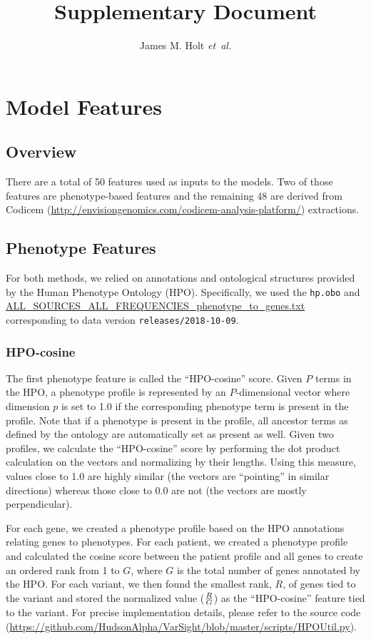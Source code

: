 \documentclass{article}
\begin{document}
\title{Supplementary Document}
\author{James M. Holt {\it et~al.}}

\maketitle

\tableofcontents

\section{Model Features}
\subsection{Overview}
There are a total of 50 features used as inputs to the models.  Two of those features are phenotype-based features and the remaining 48 are derived from Codicem (\url{http://envisiongenomics.com/codicem-analysis-platform/}) extractions.

\subsection{Phenotype Features}
For both methods, we relied on annotations and ontological structures provided by the Human Phenotype Ontology (HPO).  Specifically, we used the \texttt{hp.obo} and \url{ALL_SOURCES_ALL_FREQUENCIES_phenotype_to_genes.txt} corresponding to data version \texttt{releases/2018-10-09}.

\subsubsection{HPO-cosine}
The first phenotype feature is called the ``HPO-cosine'' score.  Given $P$ terms in the HPO, a phenotype profile is represented by an $P$-dimensional vector where dimension $p$ is set to 1.0 if the corresponding phenotype term is present in the profile.  Note that if a phenotype is present in the profile, all ancestor terms as defined by the ontology are automatically set as present as well.  Given two profiles, we calculate the ``HPO-cosine'' score by performing the dot product calculation on the vectors and normalizing by their lengths.  Using this measure, values close to 1.0 are highly similar (the vectors are ``pointing'' in similar directions) whereas those close to 0.0 are not (the vectors are mostly perpendicular).

For each gene, we created a phenotype profile based on the HPO annotations relating genes to phenotypes.  For each patient, we created a phenotype profile and calculated the cosine score between the patient profile and all genes to create an ordered rank from 1 to $G$, where $G$ is the total number of genes annotated by the HPO.  For each variant, we then found the smallest rank, $R$, of genes tied to the variant and stored the normalized value (${R \over G}$) as the ``HPO-cosine'' feature tied to the variant.  For precise implementation details, please refer to the source code (\url{https://github.com/HudsonAlpha/VarSight/blob/master/scripts/HPOUtil.py}).
\end{document}
